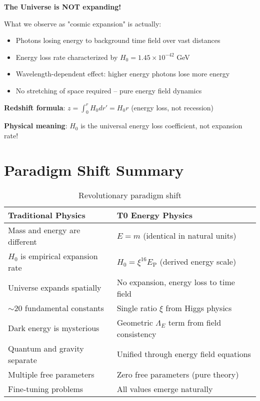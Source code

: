 \documentclass[12pt,a4paper]{article}
\newcommand{\EP}{E_{\text{P}}}
\begin{document}
	\textbf{The Universe is NOT expanding!}
	
	What we observe as "cosmic expansion" is actually:
	\begin{itemize}
		\item Photons losing energy to background time field over vast distances
		\item Energy loss rate characterized by $H_0 = 1.45 \times 10^{-42}$ GeV
		\item Wavelength-dependent effect: higher energy photons lose more energy
		\item No stretching of space required -- pure energy field dynamics
	\end{itemize}
	
	\textbf{Redshift formula}: $z = \int_0^r H_0 dr' = H_0 r$ (energy loss, not recession)
	
	\textbf{Physical meaning}: $H_0$ is the universal energy loss coefficient, not expansion rate!
	
	\section{Paradigm Shift Summary}
	
	\begin{table}[htbp]
		\centering
		\begin{tabular}{p{5.5cm}p{7.5cm}}
			\toprule
			\textbf{Traditional Physics} & \textbf{T0 Energy Physics} \\
			\midrule
			Mass and energy are different & $E = m$ (identical in natural units) \\
			$H_0$ is empirical expansion rate & $H_0 = \xi^{16} \EP$ (derived energy scale) \\
			Universe expands spatially & No expansion, energy loss to time field \\
			$\sim 20$ fundamental constants & Single ratio $\xi$ from Higgs physics \\
			Dark energy is mysterious & Geometric $\Lambda_E$ term from field consistency \\
			Quantum and gravity separate & Unified through energy field equations \\
			Multiple free parameters & Zero free parameters (pure theory) \\
			Fine-tuning problems & All values emerge naturally \\
			\bottomrule
		\end{tabular}
		\caption{Revolutionary paradigm shift}
		\label{tab:paradigm_shift_summary}
	\end{table}
	
\end{document}
